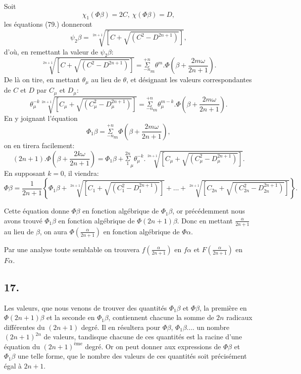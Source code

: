 \documentclass{article}
\begin{document}
Soit
\[ \chi_{1}(\Phi\beta)=2C,\ \chi(\Phi\beta)=D, \]
les équations (79.) donneront
\[ \psi_{2}\beta=\sqrt[2n+1]{[C+\sqrt{(C^{2}-D^{2n+1})}]}, \]
d'où, en remettant la valeur de $\psi_{2}\beta$:
\[ \sqrt[2n+1]{[C+\sqrt{(C^{2}-D^{2n+1})}]}=\overset{+n}{\underset{-n}{\Sigma}}_{m}\theta^{m}.\Phi\left(\beta+\frac{2m\omega}{2n+1}\right). \tag{82.} \]
De là on tire, en mettant $\theta_{\mu}$ au lieu de $\theta$, et désignant les valeurs correspondantes de $C$ et $D$ par $C_{\mu}$ et $D_{\mu}$:
\[ \theta_{\mu}^{-k}\sqrt[2n+1]{[C_{\mu}+\sqrt{(C_{\mu}^{2}-D_{\mu}^{2n+1})}]}=\overset{+n}{\underset{-n}{\Sigma}}_{m}\theta_{\mu}^{m-k}.\Phi\left(\beta+\frac{2m\omega}{2n+1}\right). \]
En y joignant l'équation
\[ \Phi_{1}\beta=\overset{+n}{\underset{-n}{\Sigma}}_{m}\Phi\left(\beta+\frac{2m\omega}{2n+1}\right), \]
on en tirera facilement:
\[ (2n+1).\Phi\left(\beta+\frac{2k\omega}{2n+1}\right)=\Phi_{1}\beta+\overset{2n}{\underset{1}{\Sigma}}_{\mu}\theta_{\mu}^{-k}.\sqrt[2n+1]{[C_{\mu}+\sqrt{(C_{\mu}^{2}-D_{\mu}^{2n+1})}]}. \tag{83.} \]
En supposant $k=0$, il viendra:
\[ \Phi\beta=\frac{1}{2n+1}\left\{\Phi_{1}\beta+\sqrt[2n+1]{[C_{1}+\sqrt{(C_{1}^{2}-D_{1}^{2n+1})}]}+\ldots+\sqrt[2n+1]{[C_{2n}+\sqrt{(C_{2n}^{2}-D_{2n}^{2n+1})}]}\right\}. \tag{84.} \]


Cette équation donne $\Phi\beta$ en fonction algébrique de $\Phi_{1}\beta$, or précédemment nous avons trouvé $\Phi_{1}\beta$ en fonction algébrique de $\Phi(2n+1)\beta$. Donc en mettant $\frac{\alpha}{2n+1}$ au lieu de $\beta$, on aura $\Phi\left(\frac{\alpha}{2n+1}\right)$ en fonction algébrique de $\Phi\alpha$.

Par une analyse toute semblable on trouvera $f\left(\frac{\alpha}{2n+1}\right)$ en $f\alpha$ et $F\left(\frac{\alpha}{2n+1}\right)$ en $F\alpha$.

\subsection*{17.}

Les valeurs, que nous venons de trouver des quantités $\Phi_{1}\beta$ et $\Phi\beta$, la première en $\Phi(2n+1)\beta$ et la seconde en $\Phi_{1}\beta$, contiennent chacune la somme de $2n$ radicaux différentes du $(2n+1)$ degré. Il en résultera pour $\Phi\beta$, $\Phi_{1}\beta....$ un nombre $(2n+1)^{2n}$ de valeurs, tandisque chacune de ces quantités est la racine d'une équation du $(2n+1)^{\text{ème}}$ degré. Or on peut donner aux expressions de $\Phi\beta$ et $\Phi_{1}\beta$ une telle forme, que le nombre des valeurs de ces quantités soit précisément égal à $2n+1$.
\end{document}
